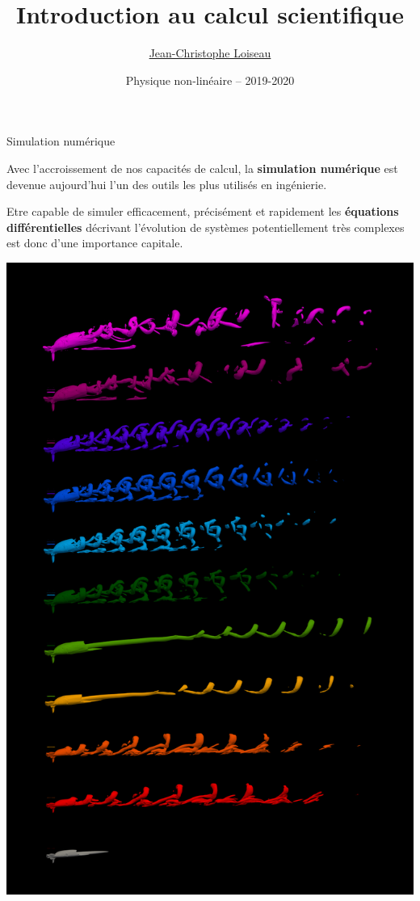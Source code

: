 \documentclass[usenames,dvipsnames,svgnames,10pt,aspectratio=169]{beamer}
\title[Nonlinear physics] %
{
	Introduction au calcul scientifique
}
\author[J.-Ch.~Loiseau] %
{
	\underline{Jean-Christophe Loiseau}
}
\institute[unused]
{
	\url{jean-christophe.loiseau@ensam.eu} \\
	Laboratoire DynFluid \\
	Arts et M\'etiers, France.
}
\date[unused]{Physique non-lin\'eaire -- 2019-2020}
\begin{document}
\titleframe	%


\begin{frame}[t, c]{Simulation numérique}{}
	\begin{minipage}{.68\textwidth}
    Avec l'accroissement de nos capacités de calcul, la \alert{\textbf{simulation numérique}} est devenue aujourd'hui l'un des outils les plus utilisés en ingénierie.

    \bigskip

    Etre capable de simuler efficacement, précisément et rapidement les \alert{\textbf{équations différentielles}} décrivant l'évolution de systèmes potentiellement très complexes est donc d'une importance capitale.
	\end{minipage}%
	\hfill
	\begin{minipage}{.28\textwidth}
    \centering
    \includegraphics[width=\textwidth]{jet_in_xflow}
	\end{minipage}

	\vspace{1cm}
\end{frame}
\end{document}
